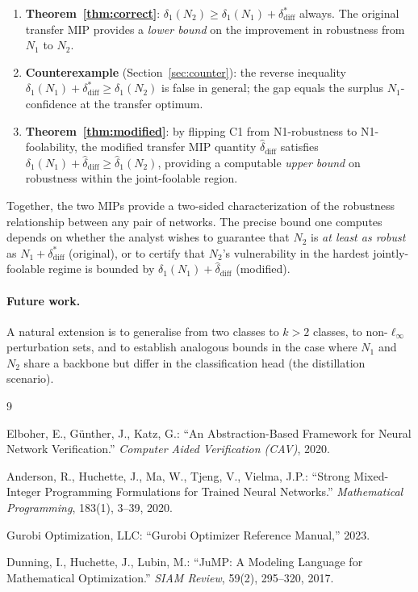 \documentclass[12pt]{article}
\theoremstyle{definition}
\theoremstyle{plain}
\theoremstyle{remark}
\newcommand{\dN}[1]{\delta_1(N_{#1})}
\newcommand{\dNmod}[1]{\hat{\delta}_1(N_{#1})}
\newcommand{\ddiff}{\delta_{\mathrm{diff}}^{*}}
\newcommand{\ddiffmod}{\hat{\delta}_{\mathrm{diff}}}
\begin{document}
\begin{enumerate}
  \item \textbf{Theorem~\ref{thm:correct}}: $\dN{2}\geq\dN{1}+\ddiff$ always.
        The original transfer MIP provides a \emph{lower bound} on the
        improvement in robustness from $N_1$ to $N_2$.
  \item \textbf{Counterexample} (Section~\ref{sec:counter}): the reverse
        inequality $\dN{1}+\ddiff\geq\dN{2}$ is false in general; the
        gap equals the surplus $N_1$-confidence at the transfer optimum.
  \item \textbf{Theorem~\ref{thm:modified}}: by flipping C1 from
        N1-robustness to N1-foolability, the modified transfer MIP
        quantity $\ddiffmod$ satisfies $\dN{1}+\ddiffmod\geq\dNmod{2}$,
        providing a computable \emph{upper bound} on robustness within
        the joint-foolable region.
\end{enumerate}

Together, the two MIPs provide a two-sided characterization of the
robustness relationship between any pair of networks.  The precise
bound one computes depends on whether the analyst wishes to guarantee
that $N_2$ is \emph{at least as robust} as $N_1+\ddiff$ (original),
or to certify that $N_2$'s vulnerability in the hardest jointly-
foolable regime is bounded by $\dN{1}+\ddiffmod$ (modified).

\paragraph{Future work.}
A natural extension is to generalise from two classes to $k>2$ classes,
to non-$\ell_\infty$ perturbation sets, and to establish analogous
bounds in the case where $N_1$ and $N_2$ share a backbone but differ
in the classification head (the distillation scenario).

\begin{thebibliography}{9}

Elboher, E., G\"unther, J., Katz, G.:
``An Abstraction-Based Framework for Neural Network Verification.''
\emph{Computer Aided Verification (CAV)}, 2020.

Anderson, R., Huchette, J., Ma, W., Tjeng, V., Vielma, J.P.:
``Strong Mixed-Integer Programming Formulations for Trained Neural Networks.''
\emph{Mathematical Programming}, 183(1), 3–39, 2020.

Gurobi Optimization, LLC:
``Gurobi Optimizer Reference Manual,'' 2023.

Dunning, I., Huchette, J., Lubin, M.:
``JuMP: A Modeling Language for Mathematical Optimization.''
\emph{SIAM Review}, 59(2), 295–320, 2017.

\end{thebibliography}
\end{document}
